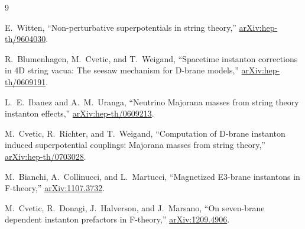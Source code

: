 \documentclass[11pt]{article}
\begin{document}
\begin{thebibliography}{9}

E.~Witten,
``Non-perturbative superpotentials in string theory,''
\href{https://arxiv.org/abs/hep-th/9604030}{arXiv:hep-th/9604030}.

R.~Blumenhagen, M.~Cvetic, and T.~Weigand,
``Spacetime instanton corrections in 4D string vacua: The seesaw mechanism
for D-brane models,''
\href{https://arxiv.org/abs/hep-th/0609191}{arXiv:hep-th/0609191}.

L.~E.~Ibanez and A.~M.~Uranga,
``Neutrino Majorana masses from string theory instanton effects,''
\href{https://arxiv.org/abs/hep-th/0609213}{arXiv:hep-th/0609213}.

M.~Cvetic, R.~Richter, and T.~Weigand,
``Computation of D-brane instanton induced superpotential couplings:
Majorana masses from string theory,''
\href{https://arxiv.org/abs/hep-th/0703028}{arXiv:hep-th/0703028}.

M.~Bianchi, A.~Collinucci, and L.~Martucci,
``Magnetized E3-brane instantons in F-theory,''
\href{https://arxiv.org/abs/1107.3732}{arXiv:1107.3732}.

M.~Cvetic, R.~Donagi, J.~Halverson, and J.~Marsano,
``On seven-brane dependent instanton prefactors in F-theory,''
\href{https://arxiv.org/abs/1209.4906}{arXiv:1209.4906}.

\end{thebibliography}
\end{document}
